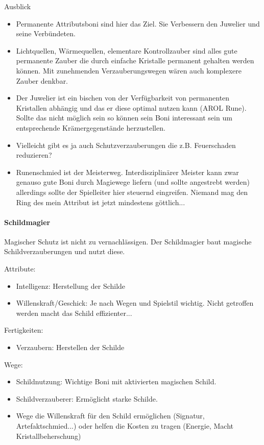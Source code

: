 \documentclass{article}
\begin{document}
Ausblick
\begin{itemize}
\item Permanente Attributsboni sind hier das Ziel. Sie Verbessern den Juwelier und seine Verbündeten.
\item Lichtquellen, Wärmequellen, elementare Kontrollzauber sind alles gute permanente Zauber die durch einfache Kristalle permanent gehalten werden können. Mit zunehmenden Verzauberungswegen wären auch komplexere Zauber denkbar.
\item Der Juwelier ist ein bischen von der Verfügbarkeit von permanenten Kristallen abhängig und das er diese optimal nutzen kann (AROL Rune). Sollte das nicht möglich sein so können sein Boni interessant sein um entsprechende Krämergegenstände herzustellen.
\item Vielleicht gibt es ja auch Schutzverzauberungen die z.B. Feuerschaden reduzieren?
\item Runenschmied ist der Meisterweg. Interdisziplinärer Meister kann zwar genauso gute Boni durch Magiewege liefern (und sollte angestrebt werden) allerdings sollte der Spielleiter hier steuernd eingreifen. Niemand mag den Ring des mein Attribut ist jetzt mindestens göttlich...
\end{itemize}

\paragraph{Schildmagier}
Magischer Schutz ist nicht zu vernachlässigen. Der Schildmagier baut magische Schildverzauberungen und nutzt diese.

Attribute:
\begin{itemize}
\item Intelligenz: Herstellung der Schilde
\item Willenskraft/Geschick: Je nach Wegen und Spielstil wichtig. Nicht getroffen werden macht das Schild effizienter...
\end{itemize}

Fertigkeiten:
\begin{itemize}
\item Verzaubern: Herstellen der Schilde
\end{itemize}

Wege:
\begin{itemize}
\item Schildnutzung: Wichtige Boni mit aktivierten magischen Schild.
\item Schildverzauberer: Ermöglicht starke Schilde.
\item Wege die Willenskraft für den Schild ermöglichen (Signatur, Artefaktschmied...) oder helfen die Kosten zu tragen (Energie, Macht Kristallbeherschung)
\end{itemize}
\end{document}
